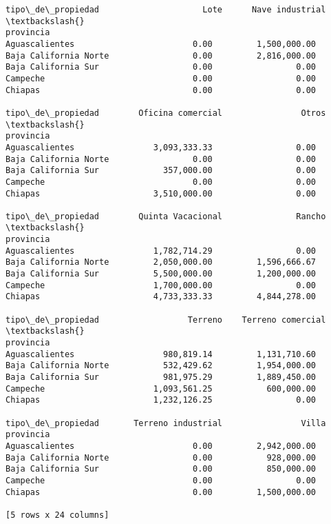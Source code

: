 \documentclass[11pt]{article}
\begin{document}
\begin{tcolorbox}[breakable, boxrule=.5pt, size=fbox, pad at break*=1mm, opacityfill=0]
\begin{Verbatim}[commandchars=\\\{\}]
tipo\_de\_propiedad                     Lote      Nave industrial  \textbackslash{}
provincia
Aguascalientes                        0.00         1,500,000.00
Baja California Norte                 0.00         2,816,000.00
Baja California Sur                   0.00                 0.00
Campeche                              0.00                 0.00
Chiapas                               0.00                 0.00

tipo\_de\_propiedad        Oficina comercial                Otros  \textbackslash{}
provincia
Aguascalientes                3,093,333.33                 0.00
Baja California Norte                 0.00                 0.00
Baja California Sur             357,000.00                 0.00
Campeche                              0.00                 0.00
Chiapas                       3,510,000.00                 0.00

tipo\_de\_propiedad        Quinta Vacacional               Rancho  \textbackslash{}
provincia
Aguascalientes                1,782,714.29                 0.00
Baja California Norte         2,050,000.00         1,596,666.67
Baja California Sur           5,500,000.00         1,200,000.00
Campeche                      1,700,000.00                 0.00
Chiapas                       4,733,333.33         4,844,278.00

tipo\_de\_propiedad                  Terreno    Terreno comercial  \textbackslash{}
provincia
Aguascalientes                  980,819.14         1,131,710.60
Baja California Norte           532,429.62         1,954,000.00
Baja California Sur             981,975.29         1,889,450.00
Campeche                      1,093,561.25           600,000.00
Chiapas                       1,232,126.25                 0.00

tipo\_de\_propiedad       Terreno industrial                Villa
provincia
Aguascalientes                        0.00         2,942,000.00
Baja California Norte                 0.00           928,000.00
Baja California Sur                   0.00           850,000.00
Campeche                              0.00                 0.00
Chiapas                               0.00         1,500,000.00

[5 rows x 24 columns]
\end{Verbatim}
\end{tcolorbox}
        
\end{document}
